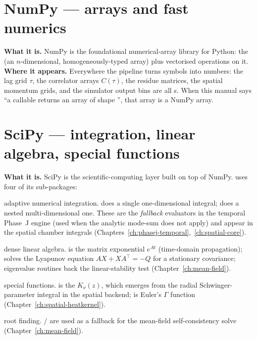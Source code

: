 \section{NumPy --- arrays and fast numerics}
\textbf{What it is.}  NumPy is the foundational numerical-array library for
Python: the  (an $n$-dimensional, homogeneously-typed array) plus
vectorised operations on it.  \textbf{Where it appears.}  Everywhere the pipeline
turns symbols into numbers: the lag grid $\tau$, the correlator arrays
$C(\tau)$, the residue matrices, the spatial momentum grids, and the simulator
output bins are all s.  When this manual says ``a callable returns
an array of shape '', that array is a NumPy array.

\section{SciPy --- integration, linear algebra, special functions}
\textbf{What it is.}  SciPy is the scientific-computing layer built on top of
NumPy.  \Daedalus{} uses four of its sub-packages:
\begin{description}[leftmargin=1.2em]
  \item[\code{scipy.integrate}] adaptive numerical integration.   does
        a single one-dimensional integral;  does a nested
        multi-dimensional one.  These are the \emph{fallback} evaluators in the
        temporal Phase~J engine (used when the analytic mode-sum does not apply)
        and appear in the spatial chamber integrals
        (Chapters~\ref{ch:phasej-temporal},~\ref{ch:spatial-core}).
  \item[\code{scipy.linalg}] dense linear algebra.   is the
        matrix exponential $e^{At}$ (time-domain propagation);
         solves the Lyapunov equation
        $AX+XA^{\!\top}=-Q$ for a stationary covariance; eigenvalue routines back
        the linear-stability test (Chapter~\ref{ch:mean-field}).
  \item[\code{scipy.special}] special functions.   is the
         $K_\nu(z)$, which
        emerges from the radial Schwinger-parameter integral in the spatial
        backend;  is Euler's $\Gamma$ function
        (Chapter~\ref{ch:spatial-heatkernel}).
  \item[\code{scipy.optimize}] root finding.   /  are
        used as a fallback for the mean-field self-consistency solve
        (Chapter~\ref{ch:mean-field}).
\end{description}

